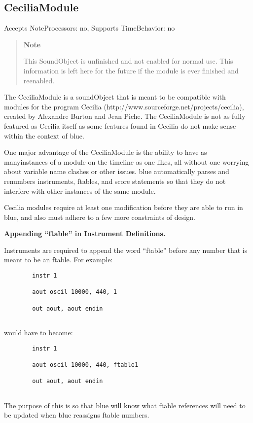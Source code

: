 \subsection{CeciliaModule}\label{ceciliaModule}

Accepts NoteProcessors: no, Supports TimeBehavior: no

\begin{quote}
\textbf{Note}

This SoundObject is unfinished and not enabled for normal use. This
information is left here for the future if the module is ever finished
and reenabled.
\end{quote}

The CeciliaModule is a soundObject that is meant to be compatible with
modules for the program Cecilia
(http://www.sourceforge.net/projects/cecilia), created by Alexandre
Burton and Jean Piche. The CeciliaModule is not as fully featured as
Cecilia itself as some features found in Cecilia do not make sense
within the context of blue.

One major advantage of the CeciliaModule is the ability to have as
manyinstances of a module on the timeline as one likes, all without one
worrying about variable name clashes or other issues. blue automatically
parses and renumbers instruments, ftables, and score statements so that
they do not interfere with other instances of the same module.

Cecilia modules require at least one modification before they are able
to run in blue, and also must adhere to a few more constraints of
design.

\textbf{Appending ``ftable'' in Instrument Definitions.}

Instruments are required to append the word ``ftable'' before any number
that is meant to be an ftable. For example:

\begin{verbatim}
        instr 1

        aout oscil 10000, 440, 1

        out aout, aout endin
      
\end{verbatim}

would have to become:

\begin{verbatim}
        instr 1

        aout oscil 10000, 440, ftable1

        out aout, aout endin
      
\end{verbatim}

The purpose of this is so that blue will know what ftable references
will need to be updated when blue reassigns ftable numbers.
